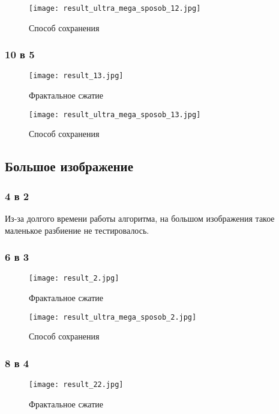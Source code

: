 \documentclass{article}
\begin{document}
\begin{figure}[h]
	\centering
	\texttt{[image: result\_ultra\_mega\_sposob\_12.jpg]}
	\caption{Способ сохранения}
	\label{fig:mpr}
\end{figure}

\subsubsection{10 в 5}
\begin{figure}[h]
	\centering
	\texttt{[image: result\_13.jpg]}
	\caption{Фрактальное сжатие}
	\label{fig:mpr}
\end{figure}

\begin{figure}[h]
	\centering
	\texttt{[image: result\_ultra\_mega\_sposob\_13.jpg]}
	\caption{Способ сохранения}
	\label{fig:mpr}
\end{figure}

\subsection{Большое изображение}
\subsubsection{4 в 2}
Из-за долгого времени работы алгоритма, на большом изображения такое маленькое разбиение не тестировалось.

\subsubsection{6 в 3}
\begin{figure}[h]
	\centering
	\texttt{[image: result\_2.jpg]}
	\caption{Фрактальное сжатие}
	\label{fig:mpr}
\end{figure}

\begin{figure}[h]
	\centering
	\texttt{[image: result\_ultra\_mega\_sposob\_2.jpg]}
	\caption{Способ сохранения}
	\label{fig:mpr}
\end{figure}

\subsubsection{8 в 4}
\begin{figure}[h]
	\centering
	\texttt{[image: result\_22.jpg]}
	\caption{Фрактальное сжатие}
	\label{fig:mpr}
\end{figure}
\end{document}
